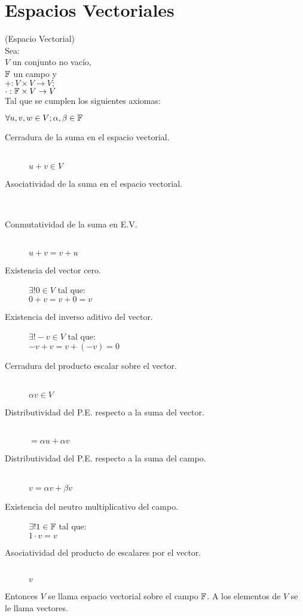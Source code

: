 \section{Espacios Vectoriales}
\begin{defin}
	(Espacio Vectorial)\\
Sea: \\
$V$ un conjunto no vac\'{i}o,\\ $\mathbb{F}$ un campo y \\  $+: V\times V \to V;$ \\$ \cdot : \mathbb{F}\times V \to V$ \\
Tal que se cumplen los siguientes axiomas:

	$\forall u,v,w \in V; \alpha, \beta \in \mathbb{F}$
\begin{description}
	\item[Cerradura de la suma en el espacio vectorial.]\ \\$u+v \in V $
	\item[Asociatividad de la suma en el espacio vectorial.]\ \\
\item[Conmutatividad de la suma en E.V.]\ \\$u+v = v+u$
\item[Existencia del vector cero.]$\exists! 0 \in V$ tal que:\\
	$0+v=v+0=v$
\item[Existencia del inverso aditivo del vector.]$\exists! -v\in V$ tal que:\\
	$-v+v=v+(-v)=0$
\item[Cerradura del producto escalar sobre el vector.]\ \\$\alpha v \in V$
\item[Distributividad del P.E. respecto a la suma del vector.]\ \\$=\alpha u + \alpha v $
\item[Distributividad del P.E. respecto a la suma del campo.]\ \\\isp{}{\alpha + \beta}$v = \alpha v + \beta v$
\item[Existencia del neutro multiplicativo del campo.]$\exists!1\in\mathbb{F}$ tal que: \\
	$1\cdot v = v$
\item[Asociatividad del producto de escalares por el vector.]\ \\ \isp{=}{\alpha\beta}$v$
\end{description}

Entonces $V$ se llama espacio vectorial sobre el campo $\mathbb{F}$. A los elementos de $V$ se le llama vectores.

\end{defin}

